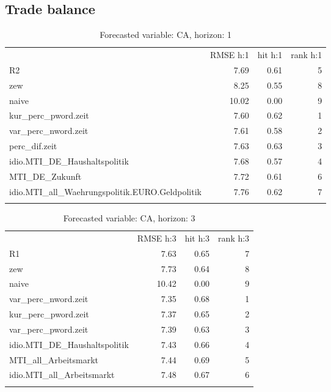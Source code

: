 \documentclass[11pt,]{article}
\title{}
\author{}
\date{}
\begin{document}
\maketitle


\subsection{Trade balance}\label{trade-balance}

\begin{longtable}[c]{@{}lrrr@{}}
\toprule\addlinespace
& RMSE h:1 & hit h:1 & rank h:1
\\\addlinespace
\midrule\endhead
R2 & 7.69 & 0.61 & 5
\\\addlinespace
zew & 8.25 & 0.55 & 8
\\\addlinespace
naive & 10.02 & 0.00 & 9
\\\addlinespace
kur\_perc\_pword.zeit & 7.60 & 0.62 & 1
\\\addlinespace
var\_perc\_nword.zeit & 7.61 & 0.58 & 2
\\\addlinespace
perc\_dif.zeit & 7.63 & 0.63 & 3
\\\addlinespace
idio.MTI\_DE\_Haushaltspolitik & 7.68 & 0.57 & 4
\\\addlinespace
MTI\_DE\_Zukunft & 7.72 & 0.61 & 6
\\\addlinespace
idio.MTI\_all\_Waehrungspolitik.EURO.Geldpolitik & 7.76 & 0.62 & 7
\\\addlinespace
\bottomrule
\addlinespace
\caption{Forecasted variable: CA, horizon: 1}
\end{longtable}

\begin{longtable}[c]{@{}lrrr@{}}
\toprule\addlinespace
& RMSE h:3 & hit h:3 & rank h:3
\\\addlinespace
\midrule\endhead
R1 & 7.63 & 0.65 & 7
\\\addlinespace
zew & 7.73 & 0.64 & 8
\\\addlinespace
naive & 10.42 & 0.00 & 9
\\\addlinespace
var\_perc\_nword.zeit & 7.35 & 0.68 & 1
\\\addlinespace
kur\_perc\_pword.zeit & 7.37 & 0.65 & 2
\\\addlinespace
var\_perc\_pword.zeit & 7.39 & 0.63 & 3
\\\addlinespace
idio.MTI\_DE\_Haushaltspolitik & 7.43 & 0.66 & 4
\\\addlinespace
MTI\_all\_Arbeitsmarkt & 7.44 & 0.69 & 5
\\\addlinespace
idio.MTI\_all\_Arbeitsmarkt & 7.48 & 0.67 & 6
\\\addlinespace
\bottomrule
\addlinespace
\caption{Forecasted variable: CA, horizon: 3}
\end{longtable}
\end{document}
